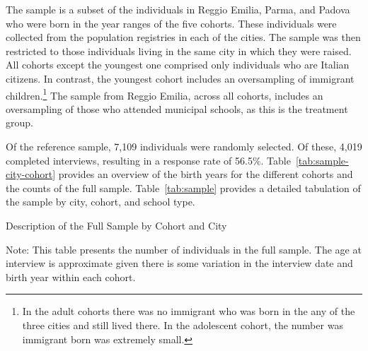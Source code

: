 The sample is a subset of the individuals in Reggio Emilia, Parma, and Padova who were born in the year ranges of the five cohorts.  These individuals were collected from the population registries in each of the cities. The sample was then restricted to those individuals living in the same city in which they were raised. All cohorts except the youngest one comprised only individuals who are Italian citizens. In contrast, the youngest cohort includes an oversampling of immigrant children.\footnote{In the adult cohorts there was no immigrant who was born in the any of the three cities and still lived there. In the adolescent cohort, the number was immigrant born was extremely small.} The sample from Reggio Emilia, across all cohorts, includes an oversampling of those who attended municipal schools, as this is the treatment group.

Of the reference sample, 7,109 individuals were randomly selected. Of these, 4,019 completed interviews, resulting in a response rate of 56.5\%. Table~\ref{tab:sample-city-cohort} provides an overview of the birth years for the different cohorts and the counts of the full sample. Table~\ref{tab:sample} provides a detailed tabulation of the sample by city, cohort, and school type.

\begin{table}[H]
\centering
\begin{threeparttable}
	\caption{Description of the Full Sample by Cohort and City}\label{tab:sample-city-cohort}
	
\begin{tablenotes}
\footnotesize
Note: This table presents the number of individuals in the full sample. The age at interview is approximate given there is some variation in the interview date and birth year within each cohort.
\end{tablenotes}
\end{threeparttable}
\end{table}

\begin{table}[H]
\centering
{}
\end{table}

